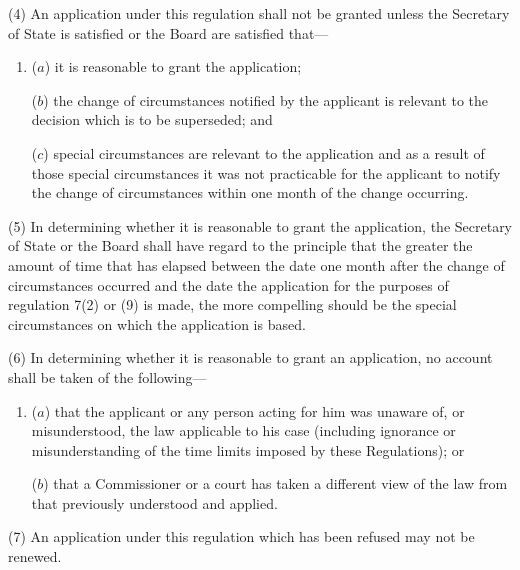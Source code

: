 \documentclass[12pt,a4paper]{article}
\begin{document}
(4) An application under this regulation shall not be granted unless the Secretary of State is satisfied 
or the Board are satisfied  %
that—
\begin{enumerate}\item[]
($a$) it is reasonable to grant the application;

($b$) the change of circumstances notified by the applicant is relevant to the decision which is to be superseded; and

($c$) special circumstances are relevant to the application and as a result of those special circumstances it was not practicable for the applicant to notify the change of circumstances within one month of the change occurring.
\end{enumerate}

(5) In determining whether it is reasonable to grant the application, the Secretary of State 
or the Board  %
shall have regard to the principle that the greater the amount of time that has elapsed between the date one month after the change of circumstances occurred and the date the application for the purposes of regulation 7(2) 
or (9)  %
is made, the more compelling should be the special circumstances on which the application is based.

(6) In determining whether it is reasonable to grant an application, no account shall be taken of the following—
\begin{enumerate}\item[]
($a$) that the applicant or any person acting for him was unaware of, or misunderstood, the law applicable to his case (including ignorance or misunderstanding of the time limits imposed by these Regulations); or

($b$) that a Commissioner or a court has taken a different view of the law from that previously understood and applied.
\end{enumerate}

(7) An application under this regulation which has been refused may not be renewed.

\end{document}
